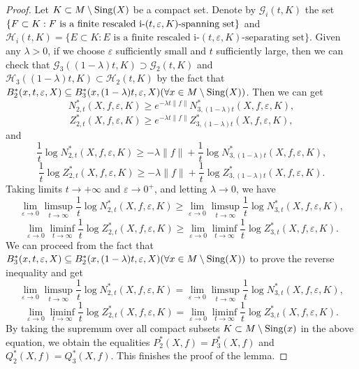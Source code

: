 \documentclass[10pt]{article}
\newtheorem*{Theorem A}{Theorem A}
\begin{document}
\begin{proof}
Let $K\subset M\setminus{\rm Sing}(X)$ be a compact set. Denote by $\mathcal{G}_i{(t, K)} $ the set $  \{ F\subset K : F \text{ is a finite rescaled i-}\\(t, \varepsilon, K)  \text{-} \text{spanning} \text{ set} \}$ and $\mathcal{H}_i{(t, K)} = \{ E\subset K : E \text{ is a finite rescaled i-} (t, \varepsilon, K)\text{-separating set} \}$. Given any $\lambda > 0$, if we choose $\varepsilon$ sufficiently small and $t$ sufficiently large, then we can check that
\(
\mathcal{G}_3((1-\lambda)t, K) \supset \mathcal{G}_2(t, K)
\)  and \(
\mathcal{H}_3((1-\lambda)t, K) \subset \mathcal{H}_2(t, K)
\) by the fact that $B_2^*(x, t, \varepsilon, X) \subseteq B_3^*(x, (1 - \lambda)t, \varepsilon, X) (\forall x\in M\setminus{\rm Sing}(X))$.
Then we can get
\[
N_{2,t}^*(X, f, \varepsilon, K) \geq e^{-\lambda t \|f\|} N_{3,(1-\lambda)t}^*(X, f, \varepsilon, K),
\]
\[
Z_{2,t}^*(X, f, \varepsilon, K) \geq e^{-\lambda t \|f\|} Z_{3,(1-\lambda)t}^*(X, f, \varepsilon, K),
\]
and
\[
\frac{1}{t} \log N_{2,t}^*(X, f, \varepsilon, K) \geq -\lambda \|f\| + \frac{1}{t} \log N_{3,(1-\lambda)t}^*(X, f, \varepsilon, K),
\]
\[
\frac{1}{t} \log Z_{2,t}^*(X, f, \varepsilon, K) \geq -\lambda \|f\| + \frac{1}{t} \log Z_{3,(1-\lambda)t}^*(X, f, \varepsilon, K).
\]
Taking limits $t\to+\infty$ and $\varepsilon\to 0^+$, and letting $\lambda \to 0$, we have
\[
\lim_{\varepsilon \to 0} \limsup_{t \to \infty} \frac{1}{t} \log N_{2,t}^*(X, f, \varepsilon, K) \geq \lim_{\varepsilon \to 0} \limsup_{t \to \infty} \frac{1}{t} \log N_{3,t}^*(X, f, \varepsilon, K),
\]
\[
\lim_{\varepsilon \to 0} \liminf_{t \to \infty} \frac{1}{t} \log Z_{2,t}^*(X, f, \varepsilon, K) \geq \lim_{\varepsilon \to 0} \liminf_{t \to \infty} \frac{1}{t} \log Z_{3,t}^*(X, f, \varepsilon, K).
\]
We can proceed from the fact that $B_3^*(x, t, \varepsilon, X) \subseteq B_2^*(x, (1 - \lambda)t, \varepsilon, X) (\forall x\in M\setminus{\rm Sing}(X))$ to prove the reverse inequality and get
\[
\lim_{\varepsilon \to 0} \limsup_{t \to \infty} \frac{1}{t} \log N_{2,t}^*(X, f, \varepsilon, K) =\lim_{\varepsilon \to 0} \limsup_{t \to \infty} \frac{1}{t} \log N_{3,t}^*(X, f, \varepsilon, K),
\]
\[
\lim_{\varepsilon \to 0} \liminf_{t \to \infty} \frac{1}{t} \log Z_{2,t}^*(X, f, \varepsilon, K) = \lim_{\varepsilon \to 0} \liminf_{t \to \infty} \frac{1}{t} \log Z_{3,t}^*(X, f, \varepsilon, K).
\]
By taking the supremum over all compact subsets $K\subset M\setminus{\rm Sing}(x)$ in the above equation, we obtain the equalities $P_2^*(X, f) = P_3^*(X, f)$ and $Q_2^*(X, f) = Q_3^*(X, f)$. This finishes the proof of the lemma.
\end{proof}
\end{document}
